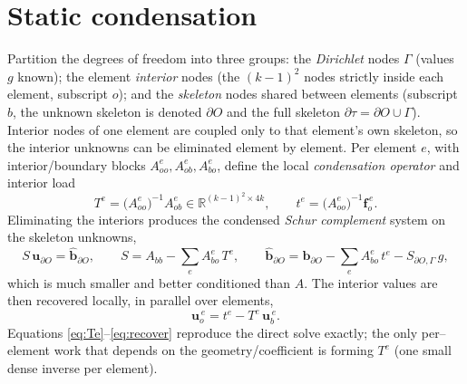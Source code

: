\documentclass[11pt]{article}
\newcommand{\Aoo}{A_{oo}}
\newcommand{\Aob}{A_{ob}}
\newcommand{\Abo}{A_{bo}}
\newcommand{\Abb}{A_{bb}}
\newcommand{\uu}{\mathbf{u}}
\newcommand{\ff}{\mathbf{f}}
\begin{document}
\section{Static condensation}
Partition the degrees of freedom into three groups: the \emph{Dirichlet} nodes
$\Gamma$ (values $g$ known); the element \emph{interior} nodes (the $(k{-}1)^2$ nodes
strictly inside each element, subscript $o$); and the \emph{skeleton} nodes shared
between elements (subscript $b$, the unknown skeleton is denoted $\partial O$ and the
full skeleton $\partial\tau=\partial O\cup\Gamma$). Interior nodes of one element are
coupled only to that element's own skeleton, so the interior unknowns can be eliminated
element by element. Per element $e$, with interior/boundary blocks
$\Aoo^e,\Aob^e,\Abo^e$, define the local \emph{condensation operator} and interior load
\begin{equation}
  T^e = \big(\Aoo^e\big)^{-1}\Aob^e \in \mathbb{R}^{(k-1)^2\times 4k},
  \qquad
  t^e = \big(\Aoo^e\big)^{-1}\ff^{\,e}_o .
  \label{eq:Te}
\end{equation}
Eliminating the interiors produces the condensed \emph{Schur complement} system on the
skeleton unknowns,
\begin{equation}
  S\,\uu_{\partial O} = \hat{\mathbf{b}}_{\partial O},
  \qquad
  S = \Abb - \sum_{e} \Abo^e\,T^e,
  \qquad
  \hat{\mathbf{b}}_{\partial O} = \mathbf{b}_{\partial O} - \sum_e \Abo^e\,t^e
      - S_{\partial O,\Gamma}\,g ,
  \label{eq:schur}
\end{equation}
which is much smaller and better conditioned than $A$. The interior values are then
recovered locally, in parallel over elements,
\begin{equation}
  \uu^{\,e}_o = t^e - T^e\,\uu^{\,e}_b .
  \label{eq:recover}
\end{equation}
Equations \eqref{eq:Te}--\eqref{eq:recover} reproduce the direct solve exactly; the only
per--element work that depends on the geometry/coefficient is forming $T^e$ (one small
dense inverse per element).
\end{document}
